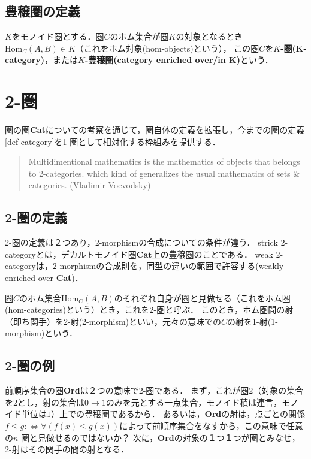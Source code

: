 \documentclass[uplatex, dvipdfmx]{jsreport}
\begin{document}
\section{豊穣圏の定義}
\begin{definition}\rm{}
    $K$をモノイド圏とする．圏$C$のホム集合が圏$K$の対象となるとき$\mathrm{Hom}_C(A,B)\in K$（これをホム対象(hom-objects)という），
    この圏$C$を\textbf{$K$-圏(K-category)}，または\textbf{$K$-豊穣圏(category enriched over/in K)}という．
\end{definition}

\chapter{2-圏}
圏の圏\textbf{Cat}についての考察を通じて，圏自体の定義を拡張し，今までの圏の定義\ref{def-category}を1-圏として相対化する枠組みを提供する．
\begin{quotation}
    Multidimentional mathematics is the mathematics of objects that belongs to 2-categories. which kind of generalizes the usual mathematics of sets \& categories. (Vladimir Voevodsky)
\end{quotation}

\section{2-圏の定義}
2-圏の定義は２つあり，2-morphismの合成についての条件が違う．
strick 2-categoryとは，デカルトモノイド圏$\mathbf{Cat}$上の豊穣圏のことである．
weak 2-categoryは，2-morphismの合成則を，同型の違いの範囲で許容する(weakly enriched over \textbf{Cat})．
\begin{definition}\rm{}
    圏$C$のホム集合$\mathrm{Hom}_C(A,B)$のそれぞれ自身が圏と見做せる（これをホム圏(hom-categories)という）とき，これを2-圏と呼ぶ．
    このとき，ホム圏間の射（即ち関手）を2-射(2-morphism)といい，元々の意味での$C$の射を1-射(1-morphism)という．
\end{definition}

\begin{definition}
    
\end{definition}

\section{2-圏の例}

前順序集合の圏\textbf{Ord}は２つの意味で2-圏である．
まず，これが圏$2$（対象の集合を$2$とし，射の集合は$0\to 1$のみを元とする一点集合，モノイド積は連言，モノイド単位は$1$）上での豊穣圏であるから．
あるいは，\textbf{Ord}の射は，点ごとの関係$f\le g:\Longleftrightarrow \forall (f(x)\le g(x))$によって前順序集合をなすから，この意味で任意の$n$-圏と見做せるのではないか？
次に，\textbf{Ord}の対象の１つ１つが圏とみなせ，2-射はその関手の間の射となる．
\end{document}
